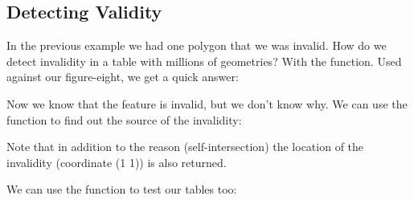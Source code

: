 \documentclass[a4paper,11pt,english]{sphinxmanual}
\begin{document}
\subsection{Detecting Validity}
\label{\detokenize{advanced:detecting-validity}}
In the previous example we had one polygon that we  was invalid. How do we detect invalidity in a table with millions of geometries? With the  function. Used against our figure-eight, we get a quick answer:

\begin{sphinxVerbatim}[commandchars=\\\{\}]
 
\end{sphinxVerbatim}

\begin{sphinxVerbatim}[commandchars=\\\{\}]
\end{sphinxVerbatim}

Now we know that the feature is invalid, but we don’t know why. We can use the  function to find out the source of the invalidity:

\begin{sphinxVerbatim}[commandchars=\\\{\}]
 
\end{sphinxVerbatim}

\begin{sphinxVerbatim}[commandchars=\\\{\}]
\PYG{p}{[} \PYG{p}{]}
\end{sphinxVerbatim}

Note that in addition to the reason (self-intersection) the location of the invalidity (coordinate (1 1)) is also returned.

We can use the  function to test our tables too:
\end{document}

